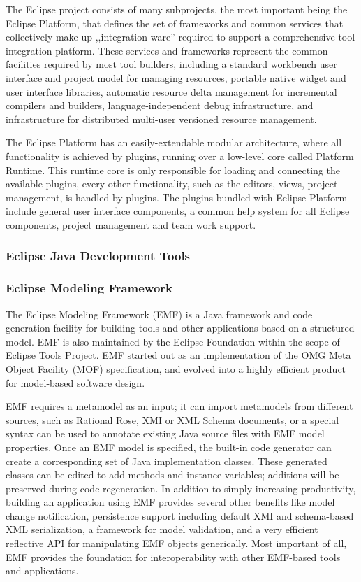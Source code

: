 The Eclipse project consists of many subprojects, the most important being the
Eclipse Platform, that defines the set of frameworks and common services that
collectively make up ,,integration-ware'' required to support a comprehensive
tool integration platform. These services and frameworks represent the common
facilities required by most tool builders, including a standard workbench user
interface and project model for managing resources, portable native widget and
user interface libraries, automatic resource delta management for incremental
compilers and builders, language-independent debug infrastructure, and
infrastructure for distributed multi-user versioned resource management.

The Eclipse Platform has an easily-extendable modular architecture, where all
functionality is achieved by plugins, running over a low-level core called
Platform Runtime. This runtime core is only responsible for loading and
connecting the available plugins, every other functionality, such as the
editors, views, project management, is handled by plugins. The plugins bundled
with Eclipse Platform include general user interface components, a common help
system for all Eclipse components, project management and team work support.

\subsubsection{Eclipse Java Development Tools}

\subsubsection{Eclipse Modeling Framework}
The Eclipse Modeling Framework (EMF) \cite{EMF} is a Java framework and code
generation facility for building tools and other applications based on a
structured model. EMF is also maintained by the Eclipse Foundation within the
scope of Eclipse Tools Project. EMF started out as an implementation of the OMG
Meta Object Facility (MOF) specification, and evolved into a highly efficient
product for model-based software design.

EMF requires a metamodel as an input; it can import metamodels from different
sources, such as Rational Rose, XMI or XML Schema documents, or a special syntax
can be used to annotate existing Java source files with EMF model properties.
Once an EMF model is specified, the built-in code generator can create a
corresponding set of Java implementation classes.
These generated classes can be edited to add methods and instance variables;
additions will be preserved during code-regeneration. In addition to simply
increasing productivity, building an application using EMF provides several
other benefits like model change notification, persistence support including
default XMI and schema-based XML serialization, a framework for model
validation, and a very efficient reflective API for manipulating EMF objects
generically. Most important of all, EMF provides the foundation for
interoperability with other EMF-based tools and applications.

